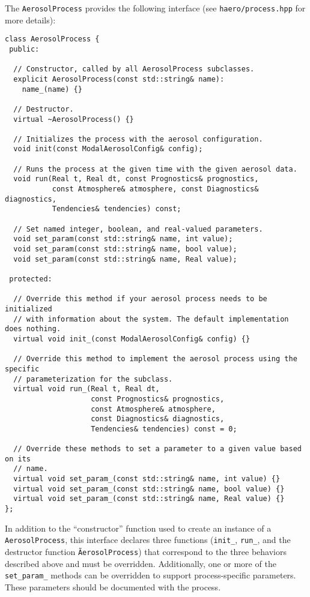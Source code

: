 The \texttt{AerosolProcess} provides the following interface (see
\texttt{haero/process.hpp} for more details):

\begin{lstlisting}
class AerosolProcess {
 public:

  // Constructor, called by all AerosolProcess subclasses.
  explicit AerosolProcess(const std::string& name):
    name_(name) {}

  // Destructor.
  virtual ~AerosolProcess() {}

  // Initializes the process with the aerosol configuration.
  void init(const ModalAerosolConfig& config);

  // Runs the process at the given time with the given aerosol data.
  void run(Real t, Real dt, const Prognostics& prognostics,
           const Atmosphere& atmosphere, const Diagnostics& diagnostics,
           Tendencies& tendencies) const;

  // Set named integer, boolean, and real-valued parameters.
  void set_param(const std::string& name, int value);
  void set_param(const std::string& name, bool value);
  void set_param(const std::string& name, Real value);

 protected:

  // Override this method if your aerosol process needs to be initialized
  // with information about the system. The default implementation does nothing.
  virtual void init_(const ModalAerosolConfig& config) {}

  // Override this method to implement the aerosol process using the specific
  // parameterization for the subclass.
  virtual void run_(Real t, Real dt,
                    const Prognostics& prognostics,
                    const Atmosphere& atmosphere,
                    const Diagnostics& diagnostics,
                    Tendencies& tendencies) const = 0;

  // Override these methods to set a parameter to a given value based on its
  // name.
  virtual void set_param_(const std::string& name, int value) {}
  virtual void set_param_(const std::string& name, bool value) {}
  virtual void set_param_(const std::string& name, Real value) {}
};
\end{lstlisting}

In addition to the ``constructor'' function used to create an instance of a
\texttt{AerosolProcess}, this interface declares three functions (\texttt{init\_},
\texttt{run\_}, and the destructor function \texttt{\~AerosolProcess})
that correspond to the three behaviors described above and must be overridden.
Additionally, one or more of the \texttt{set\_param\_} methods can be overridden
to support process-specific parameters. These parameters should be documented
with the process.

